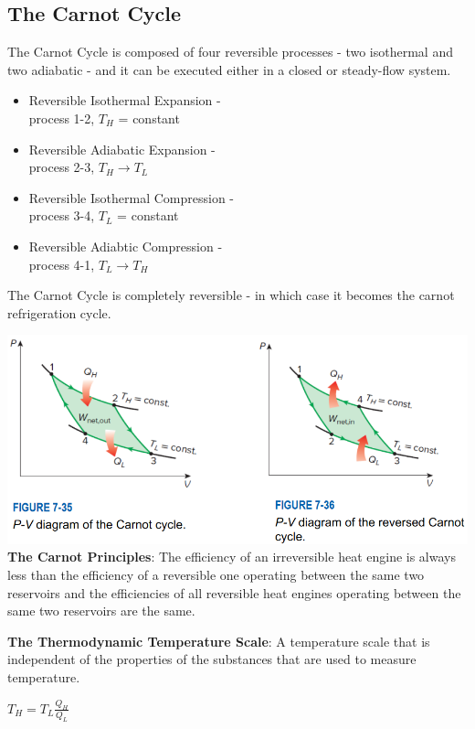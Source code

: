 \documentclass{article}
\begin{document}
\begin{multicols*}{3}
    \subsection*{The Carnot Cycle}
    The Carnot Cycle is composed of four reversible processes - two isothermal and two adiabatic - and it can be executed either in a closed or steady-flow system.
    \begin{itemize}
        \item Reversible Isothermal Expansion - \\process 1-2, $T_H$ = constant
        \item Reversible Adiabatic Expansion - \\process 2-3, $T_H\rightarrow T_L$
        \item Reversible Isothermal Compression - \\process 3-4, $T_L$ = constant
        \item Reversible Adiabtic Compression - \\process 4-1, $T_L\rightarrow T_H$
    \end{itemize}
    The Carnot Cycle is completely reversible - in which case it becomes the carnot refrigeration cycle.\par
    \includegraphics[width=\linewidth]{Images/Pv_Carnot.png}
    \textbf{The Carnot Principles}: The efficiency of an irreversible heat engine is always less than the efficiency of a reversible one operating between the same two reservoirs and the efficiencies of all reversible heat engines operating between the same two reservoirs are the same.\par
    \textbf{The Thermodynamic Temperature Scale}: A temperature scale that is independent of the properties of the substances that are used to measure temperature.\par 
    $T_H=T_L\frac{Q_H}{Q_L}$\par 

\end{multicols*}
\end{document}
